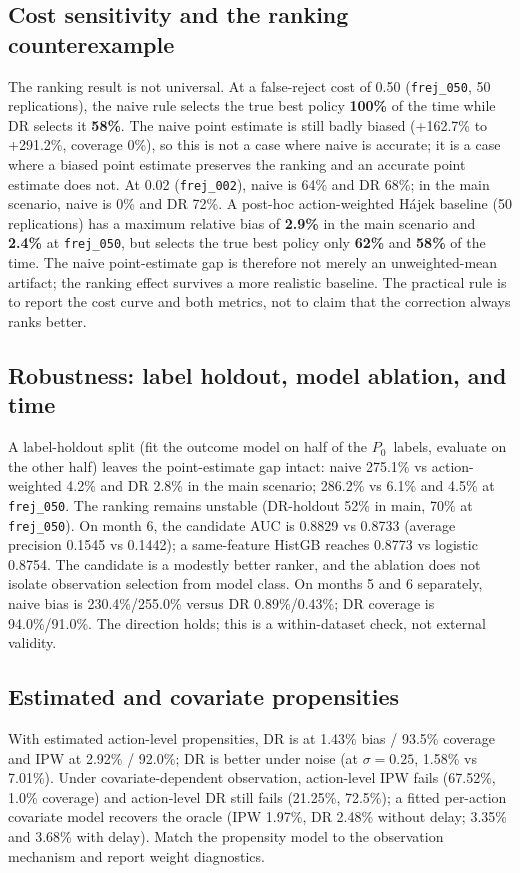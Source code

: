 \documentclass[conference]{IEEEtran}
\newcommand{\Pzero}{\ensuremath{P_0}}
\begin{document}
\subsection{Cost sensitivity and the ranking counterexample}
The ranking result is not universal. At a false-reject cost of 0.50 (\texttt{frej\_050}, 50 replications), the naive rule selects the true best policy \textbf{100\%} of the time while DR selects it \textbf{58\%}. The naive point estimate is still badly biased (+162.7\% to +291.2\%, coverage 0\%), so this is not a case where naive is accurate; it is a case where a biased point estimate preserves the ranking and an accurate point estimate does not. At 0.02 (\texttt{frej\_002}), naive is 64\% and DR 68\%; in the main scenario, naive is 0\% and DR 72\%. A post-hoc action-weighted Hájek baseline (50 replications) has a maximum relative bias of \textbf{2.9\%} in the main scenario and \textbf{2.4\%} at \texttt{frej\_050}, but selects the true best policy only \textbf{62\%} and \textbf{58\%} of the time. The naive point-estimate gap is therefore not merely an unweighted-mean artifact; the ranking effect survives a more realistic baseline. The practical rule is to report the cost curve and both metrics, not to claim that the correction always ranks better.

\subsection{Robustness: label holdout, model ablation, and time}
A label-holdout split (fit the outcome model on half of the \Pzero\ labels, evaluate on the other half) leaves the point-estimate gap intact: naive 275.1\% vs action-weighted 4.2\% and DR 2.8\% in the main scenario; 286.2\% vs 6.1\% and 4.5\% at \texttt{frej\_050}. The ranking remains unstable (DR-holdout 52\% in main, 70\% at \texttt{frej\_050}). On month 6, the candidate AUC is 0.8829 vs 0.8733 (average precision 0.1545 vs 0.1442); a same-feature HistGB reaches 0.8773 vs logistic 0.8754. The candidate is a modestly better ranker, and the ablation does not isolate observation selection from model class. On months 5 and 6 separately, naive bias is 230.4\%/255.0\% versus DR 0.89\%/0.43\%; DR coverage is 94.0\%/91.0\%. The direction holds; this is a within-dataset check, not external validity.

\subsection{Estimated and covariate propensities}
With estimated action-level propensities, DR is at 1.43\% bias / 93.5\% coverage and IPW at 2.92\% / 92.0\%; DR is better under noise (at $\sigma=0.25$, 1.58\% vs 7.01\%). Under covariate-dependent observation, action-level IPW fails (67.52\%, 1.0\% coverage) and action-level DR still fails (21.25\%, 72.5\%); a fitted per-action covariate model recovers the oracle (IPW 1.97\%, DR 2.48\% without delay; 3.35\% and 3.68\% with delay). Match the propensity model to the observation mechanism and report weight diagnostics.
\end{document}
